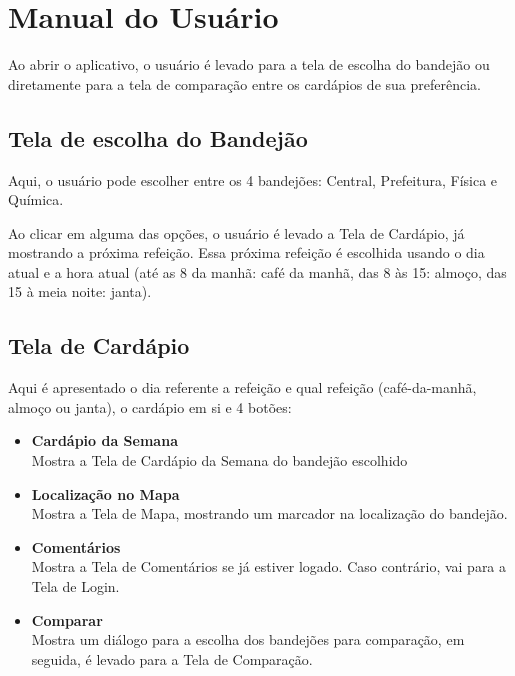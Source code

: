 





\cabecalho

\section{Manual do Usuário}
Ao abrir o aplicativo, o usuário é levado para a tela de escolha do bandejão ou diretamente para a tela de comparação entre os cardápios de sua preferência.

\subsection{Tela de escolha do Bandejão}
Aqui, o usuário pode escolher entre os 4 bandejões: Central, Prefeitura, Física e Química.

Ao clicar em alguma das opções, o usuário é levado a Tela de Cardápio, já mostrando a próxima refeição. Essa próxima refeição é escolhida usando o dia atual e a hora atual (até as 8 da manhã: café da manhã, das 8 às 15: almoço, das 15 à meia noite: janta).

\subsection{Tela de Cardápio}
Aqui é apresentado o dia referente a refeição e qual refeição (café-da-manhã, almoço ou janta), o cardápio em si e 4 botões:
\begin{itemize}
\item \textbf{Cardápio da Semana} \\
Mostra a Tela de Cardápio da Semana do bandejão escolhido
\item \textbf{Localização no Mapa} \\
Mostra a Tela de Mapa, mostrando um marcador na localização do bandejão.
\item \textbf{Comentários} \\
Mostra a Tela de Comentários se já estiver logado. Caso contrário, vai para a Tela de Login.
\item \textbf{Comparar} \\
Mostra um diálogo para a escolha dos bandejões para comparação, em seguida, é levado para a Tela de Comparação.
\end{itemize}

